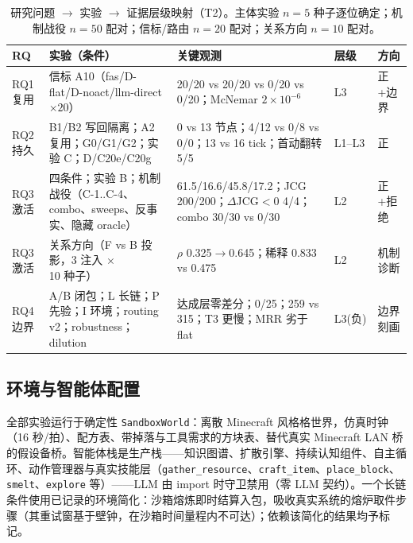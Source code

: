 \documentclass[10pt,a4paper]{ctexart}
\begin{document}
\begin{table}[t]
\centering\small
\caption{研究问题 $\rightarrow$ 实验 $\rightarrow$ 证据层级映射（T2）。主体实验 $n{=}5$ 种子逐位确定；机制战役 $n{=}50$ 配对；信标/路由 $n{=}20$ 配对；关系方向 $n{=}10$ 配对。}
\label{tab:rqmap}
\begin{tabular}{L{1.3cm}L{5.4cm}L{4.2cm}L{1.2cm}L{1.9cm}}
\toprule
\textbf{RQ} & \textbf{实验（条件）} & \textbf{关键观测} & \textbf{层级} & \textbf{方向} \\
\midrule
RQ1 复用 & 信标 A10（fas/D-flat/D-noact/llm-direct $\times20$） & 20/20 vs 20/20 vs 0/20 vs 0/20；McNemar $2\times10^{-6}$ & L3 & 正+边界 \\
RQ2 持久 & B1/B2 写回隔离；A2 复用；G0/G1/G2；实验 C；D/C20e/C20g & 0 vs 13 节点；4/12 vs 0/8 vs 0/0；13 vs 16 tick；首动翻转 5/5 & L1--L3 & 正 \\
RQ3 激活 & 四条件；实验 B；机制战役（C-1..C-4、combo、sweeps、反事实、隐藏 oracle） & 61.5/16.6/45.8/17.2；JCG 200/200；$\Delta$JCG${<}0$ 4/4；combo 30/30 vs 0/30 & L2 & 正+拒绝 \\
RQ3 激活 & 关系方向（F vs B 投影，3 注入 $\times$ 10 种子） & $\rho$ 0.325$\rightarrow$0.645；稀释 0.833 vs 0.475 & L2 & 机制诊断 \\
RQ4 边界 & A/B 闭包；L 长链；P 先验；I 环境；routing v2；robustness；dilution & 达成层零差分；0/25；259 vs 315；T3 更慢；MRR 劣于 flat & L3(负) & 边界刻画 \\
\bottomrule
\end{tabular}
\end{table}

\subsection{环境与智能体配置}
全部实验运行于确定性 \texttt{SandboxWorld}：离散 Minecraft 风格格世界，仿真时钟（16 秒/拍）、配方表、带掉落与工具需求的方块表、替代真实 Minecraft LAN 桥的假设备桥。智能体栈是生产栈——知识图谱、扩散引擎、持续认知组件、自主循环、动作管理器与真实技能层（\texttt{gather\_resource}、\texttt{craft\_item}、\texttt{place\_block}、\texttt{smelt}、\texttt{explore} 等）——LLM 由 import 时守卫禁用（零 LLM 契约）。一个长链条件使用已记录的环境简化：沙箱熔炼即时结算入包，吸收真实系统的熔炉取件步骤（其重试窗基于壁钟，在沙箱时间量程内不可达）；依赖该简化的结果均予标记。
\end{document}
